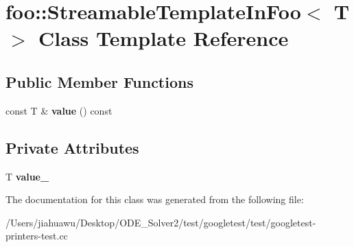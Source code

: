 \hypertarget{classfoo_1_1_streamable_template_in_foo}{}\section{foo\+:\+:Streamable\+Template\+In\+Foo$<$ T $>$ Class Template Reference}
\label{classfoo_1_1_streamable_template_in_foo}
\subsection*{Public Member Functions}
\begin{DoxyCompactItemize}
\item 
\mbox{\label{classfoo_1_1_streamable_template_in_foo_aa6e29a9a298014ce74c65423b6985023}} 
const T \& {\bfseries value} () const
\end{DoxyCompactItemize}
\subsection*{Private Attributes}
\begin{DoxyCompactItemize}
\item 
\mbox{\label{classfoo_1_1_streamable_template_in_foo_a6768ecbcc4e77edf9d5150b173d985c3}} 
T {\bfseries value\+\_\+}
\end{DoxyCompactItemize}


The documentation for this class was generated from the following file\+:\begin{DoxyCompactItemize}
\item 
/\+Users/jiahuawu/\+Desktop/\+O\+D\+E\+\_\+\+Solver2/test/googletest/test/googletest-\/printers-\/test.\+cc\end{DoxyCompactItemize}
